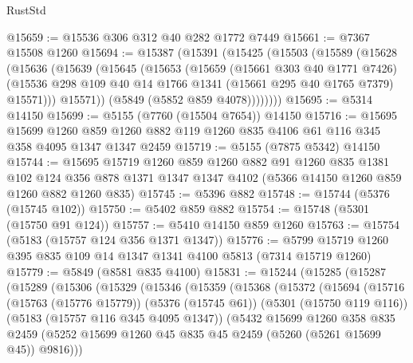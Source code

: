 \begin{lexlean}{RustStd}
\begin{coremodule}
@15659 := @15536 @306 @312 @40 @282 @1772 @7449
@15661 := @7367 @15508 @1260
@15694 := @15387
    (@15391
      (@15425
        (@15503
          (@15589
            (@15628
              (@15636
                (@15639
                  (@15645
                    (@15653
                      (@15659
                        (@15661 @303 @40 @1771 @7426)
                        (@15536
                          @298
                          @109
                          @40
                          @14
                          @1766
                          @1341
                          (@15661 @295 @40 @1765 @7379)
                          @15571)))
                    @15571))
                (@5849 (@5852 @859 @4078))))))))
@15695 := @5314 @14150
@15699 := @5155 (@7760 (@15504 @7654)) @14150
@15716 := @15695
    @15699
    @1260
    @859
    @1260
    @882
    @119
    @1260
    @835
    @4106
    @61
    @116
    @345
    @358
    @4095
    @1347
    @1347
    @2459
@15719 := @5155 (@7875 @5342) @14150
@15744 := @15695
    @15719
    @1260
    @859
    @1260
    @882
    @91
    @1260
    @835
    @1381
    @102
    @124
    @356
    @878
    @1371
    @1347
    @1347
    @4102
    (@5366 @14150 @1260 @859 @1260 @882 @1260 @835)
@15745 := @5396 @882
@15748 := @15744 (@5376 (@15745 @102))
@15750 := @5402 @859 @882
@15754 := @15748 (@5301 (@15750 @91 @124))
@15757 := @5410 @14150 @859 @1260
@15763 := @15754 (@5183 (@15757 @124 @356 @1371 @1347))
@15776 := @5799 @15719 @1260 @395 @835 @109 @14 @1347 @1341 @4100 @5813 (@7314 @15719 @1260)
@15779 := @5849 (@8581 @835 @4100)
@15831 := @15244
    (@15285
      (@15287
        (@15289
          (@15306
            (@15329
              (@15346
                (@15359
                  (@15368
                    (@15372
                      (@15694
                        (@15716
                          (@15763 (@15776 @15779))
                          (@5376 (@15745 @61))
                          (@5301 (@15750 @119 @116))
                          (@5183 (@15757 @116 @345 @4095 @1347))
                          (@5432
                            @15699
                            @1260
                            @358
                            @835
                            @2459
                            (@5252
                              @15699
                              @1260
                              @45
                              @835
                              @45
                              @2459
                              (@5260 (@5261 @15699 @45))
                              @9816)))

\end{coremodule}
\end{lexlean}
